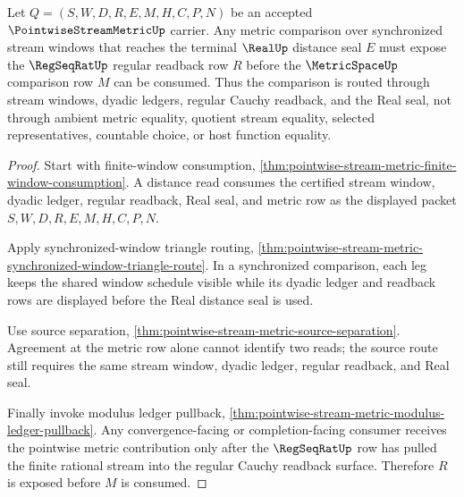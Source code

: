 \begin{theorem}
\label{thm:pointwise-stream-metric-regular-cauchy-bridge}
Let $Q=(S,W,D,R,E,M,H,C,P,N)$ be an accepted $\PointwiseStreamMetricUp$ carrier. Any metric comparison over synchronized stream windows that reaches the terminal $\RealUp$ distance seal $E$ must expose the $\RegSeqRatUp$ regular readback row $R$ before the $\MetricSpaceUp$ comparison row $M$ can be consumed. Thus the comparison is routed through stream windows, dyadic ledgers, regular Cauchy readback, and the Real seal, not through ambient metric equality, quotient stream equality, selected representatives, countable choice, or host function equality.
\end{theorem}
\begin{proof}
Start with finite-window consumption, \autoref{thm:pointwise-stream-metric-finite-window-consumption}. A distance read consumes the certified stream window, dyadic ledger, regular readback, Real seal, and metric row as the displayed packet $S,W,D,R,E,M,H,C,P,N$.

Apply synchronized-window triangle routing, \autoref{thm:pointwise-stream-metric-synchronized-window-triangle-route}. In a synchronized comparison, each leg keeps the shared window schedule visible while its dyadic ledger and readback rows are displayed before the Real distance seal is used.

Use source separation, \autoref{thm:pointwise-stream-metric-source-separation}. Agreement at the metric row alone cannot identify two reads; the source route still requires the same stream window, dyadic ledger, regular readback, and Real seal.

Finally invoke modulus ledger pullback, \autoref{thm:pointwise-stream-metric-modulus-ledger-pullback}. Any convergence-facing or completion-facing consumer receives the pointwise metric contribution only after the $\RegSeqRatUp$ row has pulled the finite rational stream into the regular Cauchy readback surface. Therefore $R$ is exposed before $M$ is consumed.
\end{proof}

